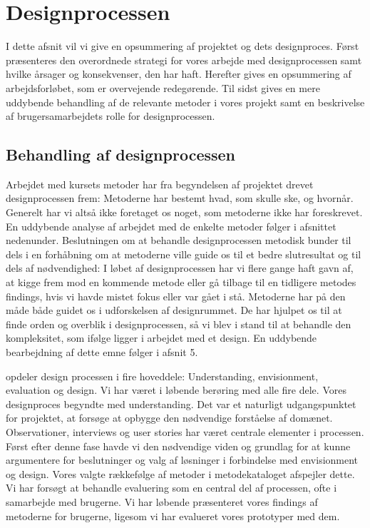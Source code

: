 \chapter{Designprocessen}
I dette afsnit vil vi give en opsummering af projektet og dets designproces.
Først præsenteres den overordnede strategi for vores arbejde med designprocessen samt hvilke årsager og konsekvenser, den har haft.
Herefter gives en opsummering af arbejdsforløbet, som er overvejende redegørende. 
Til sidst gives en mere uddybende behandling af de relevante metoder i vores projekt samt en beskrivelse af brugersamarbejdets rolle for designprocessen.

\section{Behandling af designprocessen}
Arbejdet med kursets metoder har fra begyndelsen af projektet drevet designprocessen frem: Metoderne har bestemt hvad, som skulle ske, og hvornår. Generelt har vi altså ikke foretaget os noget, som metoderne ikke har foreskrevet. En uddybende analyse af arbejdet med de enkelte metoder følger i afsnittet nedenunder.
Beslutningen om at behandle designprocessen metodisk bunder til dels i en forhåbning om at metoderne ville guide os til et bedre slutresultat og til dels af nødvendighed: I løbet af designprocessen har vi flere gange haft gavn af, at kigge frem mod en kommende metode eller gå tilbage til en tidligere metodes findings, hvis vi havde mistet fokus eller var gået i stå. 
Metoderne har på den måde både guidet os i udforskelsen af designrummet. De har hjulpet os til at finde orden og overblik i designprocessen, så vi blev i stand til at behandle den kompleksitet, som ifølge \citep{Stolterman} ligger i arbejdet med et design. En uddybende bearbejdning af dette emne følger i afsnit 5.

\citep{Benyon} opdeler design processen i fire hoveddele: Understanding, envisionment, evaluation og design. Vi har været i løbende berøring med alle fire dele. 
Vores designproces begyndte med understanding. Det var et naturligt udgangspunktet for projektet, at forsøge at opbygge den nødvendige forståelse af domænet. Observationer, interviews og user stories har været centrale elementer i processen. Først efter denne fase havde vi den nødvendige viden og grundlag for at kunne argumentere for beslutninger og valg af løsninger i forbindelse med envisionment og design. Vores valgte rækkefølge af metoder i metodekataloget afspejler dette.
Vi har forsøgt at behandle evaluering som en central del af processen, ofte i samarbejde med brugerne. Vi har løbende præsenteret vores findings af metoderne for brugerne, ligesom vi har evalueret vores prototyper med dem.


